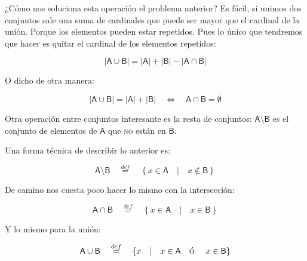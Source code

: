 \documentclass{amsart}
\theoremstyle{definition}
\theoremstyle{remark}
\numberwithin{equation}{section}
\newcommand{\abs}[1]{\left\lvert#1\right\rvert}
\newcommand{\setprop}[2]{\left\lbrace{ #1 }\quad|\quad{ #2 }\right\rbrace}
\newcommand{\setsymbol}[1]{\textsf{#1}}
\newcommand{\sA}{\setsymbol{A}}
\newcommand{\sB}{\setsymbol{B}}
\newcommand{\card}[1]{\abs{#1}}
\newcommand{\defin}{\overset {def}{=}}
\begin{document}
	¿Cómo nos soluciona esta operación el problema anterior? Es fácil, si 
unimos dos conjuntos sale una suma de cardinales que puede ser mayor que el 
cardinal de la unión. Porque los elementos pueden estar repetidos. Pues lo 
único que tendremos que hacer es quitar el cardinal de los elementos 
repetidos:


$$
\card{\sA \cup \sB} = \card{\sA} + \card{\sB} - \card{\sA \cap \sB}
$$


	O dicho de otra manera:


$$
\card{\sA\cup\sB}=\card{\sA}+\card{\sB}\quad \Leftrightarrow\quad \sA \cap 
\sB = \emptyset
$$


	Otra operación entre conjuntos interesante es la resta de conjuntos: 
$\sA\setminus\sB$ es el conjunto de elementos de $\sA$ que \textsc{no} están 
en $\sB$.


	Una forma técnica de describir lo anterior es:

$$
\sA \setminus \sB \quad \defin \quad \setprop {x\in\sA} {x\notin\sB}
$$


	De camino nos cuesta poco hacer lo mismo con la intersección:


$$
\sA \cap \sB \quad \defin \quad \setprop{x\in\sA}{x\in\sB}
$$



	Y lo mismo para la unión:


$$
\sA \cup \sB \quad \defin \quad \setprop{x}{x\in\sA \quad \text{\textsc {ó} } 
\quad x\in\sB}
$$


\paragraph{}
\end{document}
